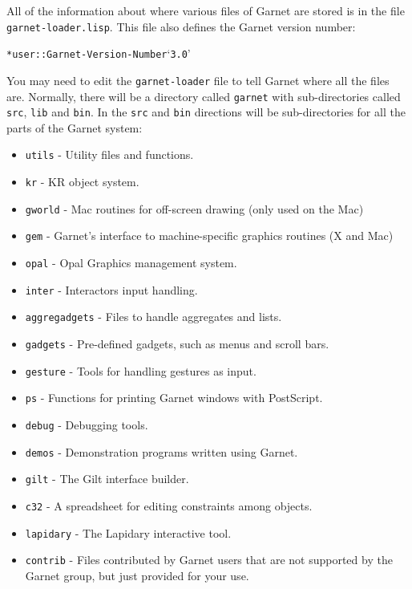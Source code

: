 \documentclass{report}
\newenvironment{programexample}{\begin{alltt}}{\end{alltt}}
\begin{document}
All of the information about where various files of Garnet are stored
is in the file \texttt{garnet-loader.lisp}.  This file also defines the
Garnet version number:
\begin{programexample}
  * user::Garnet-Version-Number `3.0'
\end{programexample}

You may need to edit the \texttt{garnet-loader} file to tell Garnet where
all the files are.  Normally, there will be a directory called
\texttt{garnet} with sub-directories called \texttt{src}, \texttt{lib} and
\texttt{bin}.  In the \texttt{src} and \texttt{bin} directions will be
sub-directories for all the parts of the Garnet system:
\begin{itemize}
\item \texttt{utils} - Utility files and functions.
  
\item \texttt{kr} - KR object system.
  
\item \texttt{gworld} - Mac routines for off-screen drawing (only used on
  the Mac)
  
\item \texttt{gem} - Garnet's interface to machine-specific graphics
  routines (X and Mac)
  
\item \texttt{opal} - Opal Graphics management system.
  
\item \texttt{inter} - Interactors input handling.
  
\item \texttt{aggregadgets} - Files to handle aggregates and lists.
  
\item \texttt{gadgets} - Pre-defined gadgets, such as menus and scroll
  bars.
  
\item \texttt{gesture} - Tools for handling gestures as input.
  
\item \texttt{ps} - Functions for printing Garnet windows with PostScript.
  
\item \texttt{debug} - Debugging tools.
  
\item \texttt{demos} - Demonstration programs written using Garnet.
  
\item \texttt{gilt} - The Gilt interface builder.
  
\item \texttt{c32} - A spreadsheet for editing constraints among objects.
  
\item \texttt{lapidary} - The Lapidary interactive tool.
  
\item \texttt{contrib} - Files contributed by Garnet users that are not
  supported by the Garnet group, but just provided for your use.
\end{itemize}
\end{document}
